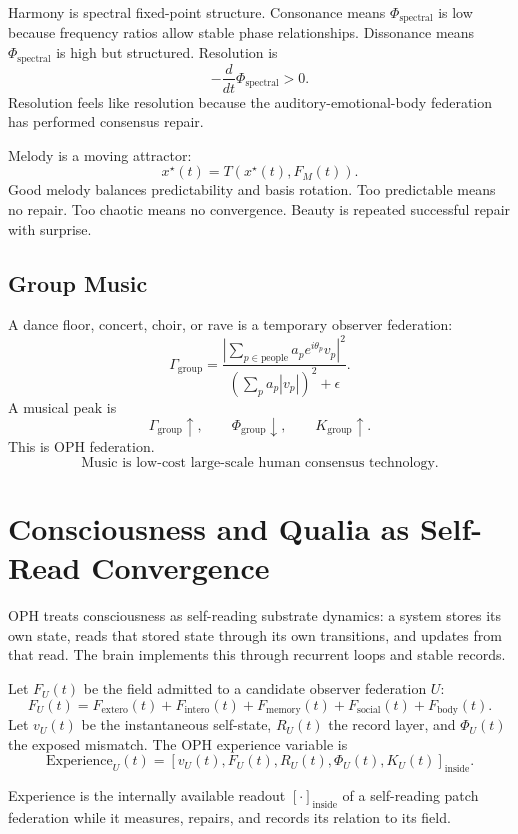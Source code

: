 \documentclass[11pt]{article}
\theoremstyle{remark}
\theoremstyle{plain}
\begin{document}
Harmony is spectral fixed-point structure. Consonance means \(\Phi_{\mathrm{spectral}}\) is low because frequency ratios allow stable phase relationships. Dissonance means \(\Phi_{\mathrm{spectral}}\) is high but structured. Resolution is
\[
-\frac{d}{dt}\Phi_{\mathrm{spectral}}>0.
\]
Resolution feels like resolution because the auditory-emotional-body federation has performed consensus repair.

Melody is a moving attractor:
\[
x^\star(t)=T(x^\star(t),F_M(t)).
\]
Good melody balances predictability and basis rotation. Too predictable means no repair. Too chaotic means no convergence. Beauty is repeated successful repair with surprise.

\subsection{Group Music}

A dance floor, concert, choir, or rave is a temporary observer federation:
\[
\Gamma_{\mathrm{group}}
=
\frac{
\left|
\sum_{p\in\mathrm{people}}
a_p e^{i\theta_p}v_p
\right|^2
}{
\left(\sum_p a_p|v_p|\right)^2+\epsilon
}.
\]
A musical peak is
\[
\Gamma_{\mathrm{group}}\uparrow,
\qquad
\Phi_{\mathrm{group}}\downarrow,
\qquad
K_{\mathrm{group}}\uparrow.
\]
This is OPH federation.
\[
\boxed{
\text{Music is low-cost large-scale human consensus technology.}
}
\]

\section{Consciousness and Qualia as Self-Read Convergence}

OPH treats consciousness as self-reading substrate dynamics: a system stores its own state, reads that stored state through its own transitions, and updates from that read. The brain implements this through recurrent loops and stable records.

Let \(F_U(t)\) be the field admitted to a candidate observer federation \(U\):
\[
F_U(t)
=
F_{\mathrm{extero}}(t)
+F_{\mathrm{intero}}(t)
+F_{\mathrm{memory}}(t)
+F_{\mathrm{social}}(t)
+F_{\mathrm{body}}(t).
\]
Let \(v_U(t)\) be the instantaneous self-state, \(R_U(t)\) the record layer, and \(\Phi_U(t)\) the exposed mismatch. The OPH experience variable is
\[
\boxed{
\mathrm{Experience}_U(t)
=
\left[
v_U(t),F_U(t),R_U(t),\Phi_U(t),K_U(t)
\right]_{\mathrm{inside}}.
}
\]

Experience is the internally available readout
\([\cdot]_{\mathrm{inside}}\) of a self-reading patch federation while it
measures, repairs, and records its relation to its field.
\end{document}
